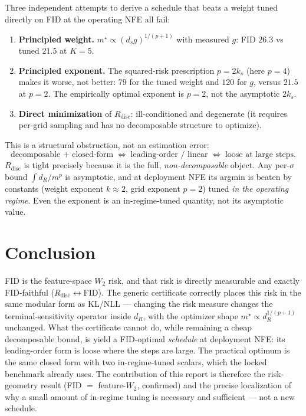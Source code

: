 \documentclass[11pt]{article}
\begin{document}
Three independent attempts to derive a schedule that beats a weight tuned
directly on FID at the operating NFE all fail:
\begin{enumerate}
\item \textbf{Principled weight.} $m^\star\propto(d_s g)^{1/(p+1)}$ with
measured $g$: FID $26.3$ vs tuned $21.5$ at $K{=}5$.
\item \textbf{Principled exponent.} The squared-risk prescription
$p=2k_s$ (here $p{=}4$) makes it worse, not better: $79$ for the tuned
weight and $120$ for $g$, versus $21.5$ at $p{=}2$. The empirically
optimal exponent is $p{=}2$, not the asymptotic $2k_s$.
\item \textbf{Direct minimization} of $R_{\mathrm{disc}}$: ill-conditioned
and degenerate (it requires per-grid sampling and has no decomposable
structure to optimize).
\end{enumerate}

\noindent
This is a structural obstruction, not an estimation error:
\[
\text{decomposable + closed-form}\;\Longleftrightarrow\;\text{leading-order / linear}\;\Longleftrightarrow\;\text{loose at large steps.}
\]
$R_{\mathrm{disc}}$ is tight precisely because it is the full,
\emph{non-decomposable} object. Any per-$\sigma$ bound
$\int d_R/m^p$ is asymptotic, and at deployment NFE its argmin is beaten
by constants (weight exponent $k\!\approx\!2$, grid exponent $p\!=\!2$)
tuned \emph{in the operating regime}. Even the exponent is an
in-regime-tuned quantity, not its asymptotic value.

\section{Conclusion}
\label{sec:conclusion}

FID is the feature-space $W_2$ risk, and that risk is directly measurable
and exactly FID-faithful ($R_{\mathrm{disc}}\!\leftrightarrow\!$FID). The
generic certificate correctly places this risk in the same modular form
as KL/NLL --- changing the risk measure changes the terminal-sensitivity
operator inside $d_R$, with the optimizer shape $m^\star\propto
d_R^{1/(p+1)}$ unchanged. What the certificate cannot do, while remaining
a cheap decomposable bound, is yield a FID-optimal \emph{schedule} at
deployment NFE: its leading-order form is loose where the steps are
large. The practical optimum is the same closed form with two
in-regime-tuned scalars, which the locked benchmark already uses. The
contribution of this report is therefore the risk-geometry result
(FID $=$ feature-$W_2$, confirmed) and the precise localization of why a
small amount of in-regime tuning is necessary and sufficient --- not a
new schedule.
\end{document}
